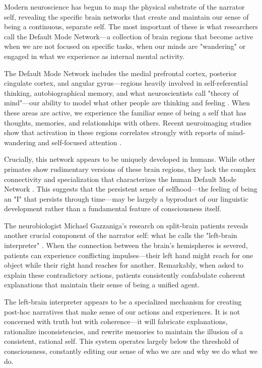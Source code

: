 Modern neuroscience has begun to map the physical substrate of the narrator self, revealing the specific brain networks that create and maintain our sense of being a continuous, separate self. The most important of these is what researchers call the Default Mode Network—a collection of brain regions that become active when we are not focused on specific tasks, when our minds are "wandering" or engaged in what we experience as internal mental activity.

The Default Mode Network includes the medial prefrontal cortex, posterior cingulate cortex, and angular gyrus—regions heavily involved in self-referential thinking, autobiographical memory, and what neuroscientists call "theory of mind"—our ability to model what other people are thinking and feeling \parencite{raichle2001default,buckner2008brain}. When these areas are active, we experience the familiar sense of being a self that has thoughts, memories, and relationships with others. Recent neuroimaging studies show that activation in these regions correlates strongly with reports of mind-wandering and self-focused attention \parencite{christoff2009experience,andrews2013evidence}.

Crucially, this network appears to be uniquely developed in humans. While other primates show rudimentary versions of these brain regions, they lack the complex connectivity and specialization that characterizes the human Default Mode Network \parencite{mars2013connectivity,schilbach2008minds}. This suggests that the persistent sense of selfhood—the feeling of being an "I" that persists through time—may be largely a byproduct of our linguistic development rather than a fundamental feature of consciousness itself.

The neurobiologist Michael Gazzaniga's research on split-brain patients reveals another crucial component of the narrator self: what he calls the "left-brain interpreter" \parencite{gazzaniga2011who}. When the connection between the brain's hemispheres is severed, patients can experience conflicting impulses—their left hand might reach for one object while their right hand reaches for another. Remarkably, when asked to explain these contradictory actions, patients consistently confabulate coherent explanations that maintain their sense of being a unified agent.

The left-brain interpreter appears to be a specialized mechanism for creating post-hoc narratives that make sense of our actions and experiences. It is not concerned with truth but with coherence—it will fabricate explanations, rationalize inconsistencies, and rewrite memories to maintain the illusion of a consistent, rational self. This system operates largely below the threshold of consciousness, constantly editing our sense of who we are and why we do what we do.

